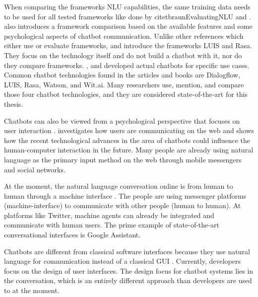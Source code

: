 When comparing the frameworks NLU capabilities, the same training data needs to be used for all tested frameworks like done by citet{braunEvaluatingNLU} and \citet{gregori2017evaluation}.
\citet{dutta2017developing} also introduces a framework comparison based on the available features and some psychological aspects of chatbot communication.
Unlike other references which either use or evaluate frameworks, \citet{luis2015williams} and \citet{rasabocklisch2017} 
introduce the frameworks LUIS\cite{luis2015williams} and Rasa\cite{rasabocklisch2017}. 
They focus on the technology itself and do not build a chatbot with it, nor do they compare frameworks.
\citet{dutta2017developing, pharmacybo}, and \citet{PRZEGALINSKA2019785} developed actual chatbots for specific use cases.
Common chatbot technologies found in the articles and books are Dialogflow, LUIS,  Rasa, Watson, and Wit.ai.
Many researchers use, mention, and compare those four chatbot technologies, and they are considered state-of-the-art for this thesis.

Chatbots can also be viewed from a psychological perspective that focuses on user interaction \citet{folstad2017chatbots}.
\citet{folstad2017chatbots} investigates how users are communicating on the web and shows how the recent technological advances in the area of chatbots could influence the human-computer interaction in the future.
Many people are already using natural language as the primary input method on the web through mobile messengers and social networks. 

At the moment, the natural language conversation online is from human to human through a machine interface \cite{folstad2017chatbots}.
The people are using messenger platforms (machine-interface) to communicate with other people (human to human).
At platforms like Twitter, machine agents can already be integrated and communicate with human users.
The prime example of state-of-the-art conversational interfaces is Google Assistant.
 
Chatbots are different from classical software interfaces because they use natural language for communication instead of a classical GUI \citet{folstad2017chatbots}.
Currently, developers focus on the design of user interfaces.
The design focus for chatbot systems lies in the conversation, which is an entirely different approach than developers are used to at the moment.

